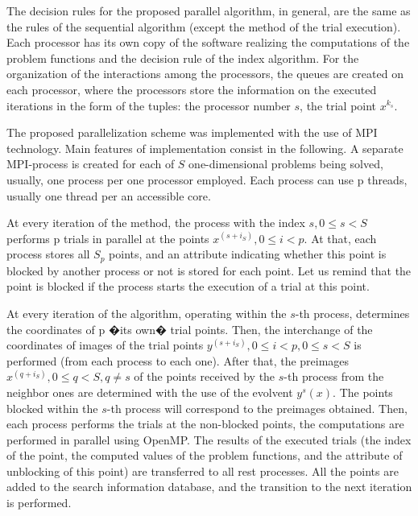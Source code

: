 \documentclass[runningheads]{llncs}
\begin{document}
The decision rules for the proposed parallel algorithm, in general, are the same as the rules of the
sequential algorithm (except the method of the trial execution). Each processor has its own copy
of the software realizing the computations of the problem functions and the decision rule of the
index algorithm. For the organization of the interactions among the processors, the queues are
created on each processor, where the processors store the information on the executed iterations
in the form of the tuples: the processor number \(s\), the trial point \(x{}^{k_s}\).
\par
The proposed parallelization scheme was implemented with the use of MPI technology. Main
features of implementation consist in the following. A separate MPI-process is created for each
of \(S\) one-dimensional problems being solved, usually, one process per one processor
employed. Each process can use p threads, usually one thread per an accessible core.
\par
At every iteration of the method, the process with the index \(s,0\leqslant s< S\) performs p
trials in parallel at the points \(x^{(s+i_S)},0\leqslant i<p\). At that, each process stores all
\(S_p\) points, and an attribute indicating whether this point is blocked by another process or
not is stored for each point. Let us remind that the point is blocked if the process starts the
execution of a trial at this point.
\par
At every iteration of the algorithm, operating within the \(s\)-th process, determines the
coordinates of p �its own� trial points. Then, the interchange of the coordinates of images of
the trial points \(y^{(s+i_S)},0\leqslant i<p, 0\leqslant s< S\) is performed (from each process to
each one). After that, the preimages \(x^{(q+i_S)},0\leqslant q<S,q\not=s\) of the points
received by the \(s\)-th process from the neighbor ones are determined with the use of the
evolvent \(y^s (x)\). The points blocked within the \(s\)-th process will correspond to the
preimages obtained. Then, each process performs the trials at the non-blocked points, the
computations are performed in parallel using OpenMP. The results of the executed trials (the
index of the point, the computed values of the problem functions, and the attribute of
unblocking of this point) are transferred to all rest processes. All the points are added to the
search information database, and the transition to the next iteration is performed.
\par

\end{document}
